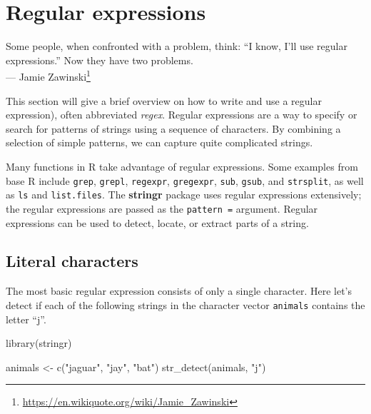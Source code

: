 \documentclass[
]{krantz}
\makeatletter
\newenvironment{Shaded}{\begin{snugshade}}{\end{snugshade}}
\newcommand{\FunctionTok}[1]{\textcolor[rgb]{0.00,0.00,0.00}{#1}}
\newcommand{\NormalTok}[1]{#1}
\newcommand{\OtherTok}[1]{\textcolor[rgb]{0.56,0.35,0.01}{#1}}
\newcommand{\StringTok}[1]{\textcolor[rgb]{0.31,0.60,0.02}{#1}}
\DeclareRobustCommand{\href}[2]{#2\footnote{\url{#1}}}
\renewenvironment{quote}{\begin{VF}}{\end{VF}}
\renewcommand{\href}[2]{#2\footnote{\url{#1}}}
\newenvironment{kframe}{%
\medskip{}
\setlength{\fboxsep}{.8em}
 \def\at@end@of@kframe{}%
 \ifinner\ifhmode%
  \def\at@end@of@kframe{\end{minipage}}%
  \begin{minipage}{\columnwidth}%
 \fi\fi%
 \def\FrameCommand##1{\hskip\@totalleftmargin \hskip-\fboxsep
 \colorbox{shadecolor}{##1}\hskip-\fboxsep
     \hskip-\linewidth \hskip-\@totalleftmargin \hskip\columnwidth}%
 \MakeFramed {\advance\hsize-\width
   \@totalleftmargin\z@ \linewidth\hsize
   \@setminipage}}%
 {\par\unskip\endMakeFramed%
 \at@end@of@kframe}
\renewenvironment{Shaded}{\begin{kframe}}{\end{kframe}}
\makeatother
\begin{document}
\cleardoublepage

\hypertarget{appendix-appendices}{%
\appendix {}}


\hypertarget{regexp}{%
\chapter{Regular expressions}\label{regexp}}

\begin{quote}
Some people, when confronted with a problem, think: ``I know, I'll use regular expressions.'' Now they have two problems.\\
\hfill --- \href{https://en.wikiquote.org/wiki/Jamie_Zawinski}{Jamie Zawinski}
\end{quote}

This section will give a brief overview on how to write and use a regular expression), often abbreviated \emph{regex}. Regular expressions are a way to specify or search for patterns of strings using a sequence of characters. By combining a selection of simple patterns, we can capture quite complicated strings.

Many functions in R take advantage of regular expressions. Some examples from base R include \texttt{grep}, \texttt{grepl}, \texttt{regexpr}, \texttt{gregexpr}, \texttt{sub}, \texttt{gsub}, and \texttt{strsplit}, as well as \texttt{ls} and \texttt{list.files}. The \textbf{stringr} package \citep{Wickham19} uses regular expressions extensively; the regular expressions are passed as the \texttt{pattern\ =} argument. Regular expressions can be used to detect, locate, or extract parts of a string.

\hypertarget{literal-characters}{%
\section{Literal characters}\label{literal-characters}}

The most basic regular expression consists of only a single character. Here let's detect if each of the following strings in the character vector \texttt{animals} contains the letter ``j''.

\begin{Shaded}
\begin{Highlighting}[]
\FunctionTok{library}\NormalTok{(stringr)}

\NormalTok{animals }\OtherTok{\textless{}{-}} \FunctionTok{c}\NormalTok{(}\StringTok{"jaguar"}\NormalTok{, }\StringTok{"jay"}\NormalTok{, }\StringTok{"bat"}\NormalTok{)}
\FunctionTok{str\_detect}\NormalTok{(animals, }\StringTok{"j"}\NormalTok{)}
\end{Highlighting}
\end{Shaded}
\end{document}
